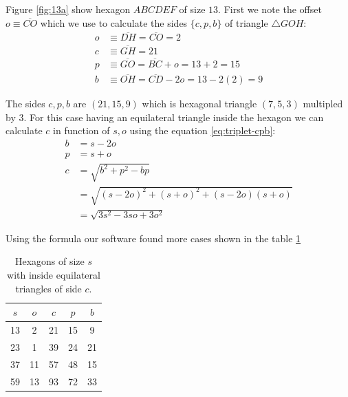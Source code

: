 \documentclass[11pt]{article}
\begin{document}
Figure \ref{fig:13a} show hexagon $ABCDEF$ of size $13$. First we note the offset $o \equiv \overline{CO}$ which we use to calculate the sides $\{c,p,b\}$ of triangle $\triangle{GOH}$:
\begin{align}
o &\equiv \overline{DH} = \overline{CO} = 2 \nonumber\\
c &\equiv \overline{GH} = 21 \nonumber\\
p &\equiv \overline{GO} = \overline{BC} + o = 13+2 = 15 \nonumber\\
b &\equiv \overline{OH} = \overline{CD} - 2o = 13 - 2(2) = 9
\end{align}

The sides $c,p,b$ are $(21,15,9)$ which is hexagonal triangle $(7,5,3)$ multipled by $3$. For this case having an equilateral triangle inside the hexagon we can calculate $c$ in function of $s,o$ using the equation \ref{eq:triplet-cpb}:
\begin{align}
b &= s - 2o \nonumber\\
p &= s + o \nonumber\\
c &= \sqrt{b^2 + p^2 - bp} \nonumber\\
   &= \sqrt{(s - 2o)^2 + (s+o)^2 + (s - 2o)(s+o)} \nonumber\\
   &= \sqrt{3s^2 - 3so + 3o^2}
\end{align}

Using the formula our software found more cases shown in the table \ref{tbl:eqtriangles}
\begin{table}[H]
\begin{center}
\begin{tabular}{| c c | c c c |} 
 \hline
 $s$ & $o$ & $c$ & $p$ & $b$ \\ [0.5ex] 
 \hline\hline
  13 &  2 &  21 &  15 &  9 \\ \hline
  23 &  1 &  39 &  24 & 21 \\ \hline
  37 & 11 &  57 &  48 & 15 \\ \hline
  59 & 13 &  93 &  72 & 33 \\ \hline
\end{tabular}
\caption{Hexagons of size $s$ with inside equilateral triangles of side $c$.}
\label{tbl:eqtriangles}
\end{center}
\end{table}
\end{document}
